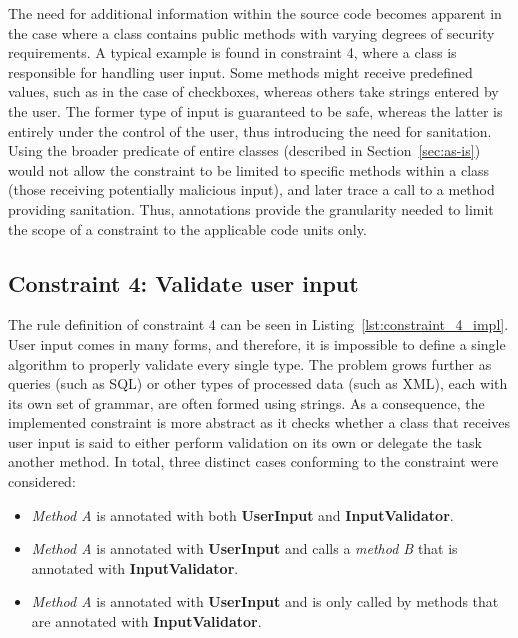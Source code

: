 The need for additional information within the source code becomes apparent in the case where a class contains public methods with varying degrees of security requirements. A typical example is found in constraint 4, where a class is responsible for handling user input. Some methods might receive predefined values, such as in the case of checkboxes, whereas others take strings entered by the user. The former type of input is guaranteed to be safe, whereas the latter is entirely under the control of the user, thus introducing the need for sanitation. Using the broader predicate of entire classes (described in Section~\ref{sec:as-is}) would not allow the constraint to be limited to specific methods within a class (those receiving potentially malicious input), and later trace a call to a method providing sanitation. Thus, annotations provide the granularity needed to limit the scope of a constraint to the applicable code units only.

\subsection{Constraint 4: Validate user input}
The rule definition of constraint 4 can be seen in Listing~\ref{lst:constraint_4_impl}.
User input comes in many forms, and therefore, it is impossible to define a single algorithm to properly validate every single type. The problem grows further as queries (such as SQL) or other types of processed data (such as XML), each with its own set of grammar, are often formed using strings. As a consequence, the implemented constraint is more abstract as it checks whether a class that receives user input is said to either perform validation on its own or delegate the task another method. In total, three distinct cases conforming to the constraint were considered: 

\begin{itemize}
    \item \textit{Method A} is annotated with both \textbf{UserInput} and \textbf{InputValidator}.
    
    \item \textit{Method A} is annotated with \textbf{UserInput} and calls a \textit{method B} that is annotated with \textbf{InputValidator}.
    
    \item \textit{Method A} is annotated with \textbf{UserInput} and is only called by methods that are annotated with \textbf{InputValidator}.
\end{itemize}

